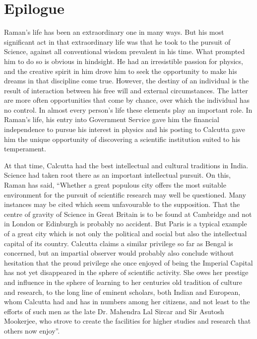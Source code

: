 \chapter*{Epilogue}


Raman's life has been an extraordinary one in many ways.
But his most significant act in that extraordinary life was that
he took to the pursuit of Science, against all conventional wisdom
prevalent in his time. What prompted him to do so is obvious
in hindsight. He had an irresistible passion for physics, and the
creative spirit in him drove him to seek the opportunity to make
his dreams in that discipline come true. However, the destiny of
an individual is the result of interaction between his free will and
external circumstances. The latter are more often opportunities
that come by chance, over which the individual has no control.
In almost every person's life these elements play an important
role. In Raman's life, his entry into Government Service gave
him the financial independence to pursue his interest in physics
and his posting to Calcutta gave him the unique opportunity of
discovering a scientific institution suited to his temperament.

At that time, Calcutta had the best intellectual and cultural
traditions in India. Science had taken root there as an important
intellectual pursuit. On this, Raman has said, ``Whether a great
populous city offers the most suitable environment for the pursuit
of scientific research may well be questioned. Many instances may
be cited which seem unfavourable to the supposition. That the
centre of gravity of Science in Great Britain is to be found at
Cambridge and not in London or Edinburgh is probably no
accident. But Paris is a typical example of a great city which is
not only the political and social but also the intellectual capital
of its country. Calcutta claims a similar privilege so far as
Bengal is concerned, but an impartial observer would probably
also conclude without hesitation that the proud privilege she once
enjoyed of being the Imperial Capital has not yet disappeared
in the sphere of scientific activity. She owes her prestige and
influence in the sphere of learning to her centuries old tradition
of culture and research, to the long line of eminent scholars, both
Indian and European, whom Calcutta had and has in numbers
among her citizens, and not least to the efforts of such men as
the late Dr. Mahendra Lal Sircar and Sir Asutosh Mookerjee,
who strove to create the facilities for higher studies and research
that others now enjoy''.

